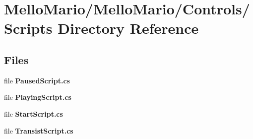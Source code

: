 \section{Mello\+Mario/\+Mello\+Mario/\+Controls/\+Scripts Directory Reference}
\label{dir_510824c97f2dc2f8f9a2c0bca2fcc9ff}
\subsection*{Files}
\begin{DoxyCompactItemize}
\item 
file \textbf{ Paused\+Script.\+cs}
\item 
file \textbf{ Playing\+Script.\+cs}
\item 
file \textbf{ Start\+Script.\+cs}
\item 
file \textbf{ Transist\+Script.\+cs}
\end{DoxyCompactItemize}

